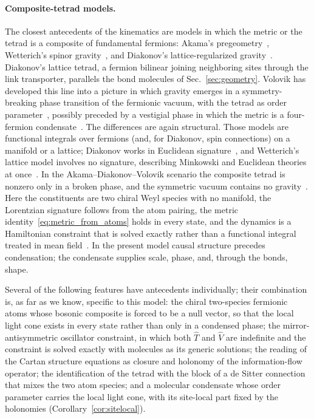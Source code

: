 \documentclass[reprint,aps,prd,amsmath,amssymb,superscriptaddress,nofootinbib,floatfix]{revtex4-2}
\theoremstyle{plain}
\theoremstyle{definition}
\theoremstyle{remark}
\newcommand{\Tc}{\hat{T}}
\newcommand{\Vc}{\hat{V}}
\begin{document}
\paragraph*{Composite-tetrad models.} The closest antecedents of the kinematics are models in which the metric or the
tetrad is a composite of fundamental fermions: Akama's pregeometry~\cite{Akama1978,AkamaCMT1978}, Wetterich's spinor
gravity~\cite{Wetterich2004,Wetterich2011}, and Diakonov's lattice-regularized gravity~\cite{Diakonov2011,VladimirovDiakonov2012}.
Diakonov's lattice tetrad, a fermion bilinear joining neighboring sites through the link transporter, parallels the bond
molecules of Sec.~\ref{sec:geometry}. Volovik has developed this line into a picture in which gravity emerges in a
symmetry-breaking phase transition of the fermionic vacuum, with the tetrad as order parameter~\cite{Volovik2022}, possibly
preceded by a vestigial phase in which the metric is a four-fermion condensate~\cite{Volovik2024}. The differences are again
structural. Those models are functional integrals over fermions (and, for Diakonov, spin connections) on a manifold or a
lattice; Diakonov works in Euclidean signature~\cite{Diakonov2011}, and Wetterich's lattice model involves no signature,
describing Minkowski and Euclidean theories at once~\cite{Wetterich2011}. In the Akama--Diakonov--Volovik scenario the composite tetrad is
nonzero only in a broken phase, and the symmetric vacuum contains no gravity~\cite{Volovik2022}. Here the constituents are two
chiral Weyl species with no manifold, the Lorentzian signature follows from the atom pairing, the metric
identity~\eqref{eq:metric_from_atoms} holds in every state, and the dynamics is a Hamiltonian constraint that is solved
exactly rather than a functional integral treated in mean field~\cite{VladimirovDiakonov2012}. In the present model causal
structure precedes condensation; the condensate supplies scale, phase, and, through the bonds, shape.

Several of the following features
have antecedents individually; their combination is, as far as we know, specific to this model: the chiral two-species fermionic atoms whose bosonic composite is forced to be a null vector, so that the
local light cone exists in every state rather than only in a condensed phase; the
mirror-antisymmetric oscillator constraint, in which both $\Tc$ and $\Vc$ are indefinite and the constraint is
solved exactly with molecules as its generic solutions; the reading of the Cartan structure equations as
closure and holonomy of the information-flow operator; the identification of the tetrad with the
block of a de Sitter connection that mixes the two atom species; and a molecular condensate whose order parameter
carries the local light cone, with its site-local part fixed by the holonomies (Corollary~\ref{cor:sitelocal}).
\end{document}
